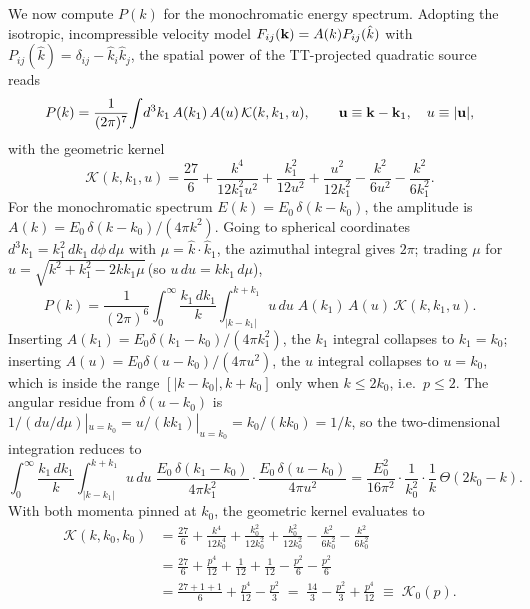 \documentclass[10pt,prd,aps,nobibnotes,superscriptaddress,preprintnumbers,notitlepage]{revtex4-1}
\newcommand{\khat}{\hat{k}}
\newcommand{\kb}{{\bf k}}
\newcommand{\ub}{{\bf u}}
\begin{document}
We now compute $P(k)$ for the monochromatic energy spectrum. Adopting the
isotropic, incompressible velocity model
$F_{ij}(\kb)=A(k)P_{ij}(\khat)$ with $P_{ij}(\khat)=\delta_{ij}-\khat_i\khat_j$,
the spatial power of the TT-projected quadratic source reads
\begin{equation}
  P(k) = \frac{1}{(2\pi)^7}\!\int\!d^3k_1\,
  A(k_1)\,A(u)\,\mathcal{K}(k,k_1,u),
  \qquad \ub\equiv\kb-\kb_1,\quad u\equiv|\ub|,
  \label{eq:Pk-impulsive}
\end{equation}
with the geometric kernel
\begin{equation}
  \mathcal{K}(k,k_1,u) = \frac{27}{6}
  +\frac{k^4}{12k_1^2u^2}+\frac{k_1^2}{12u^2}+\frac{u^2}{12k_1^2}
  -\frac{k^2}{6u^2}-\frac{k^2}{6k_1^2}.
  \label{eq:K-impulsive}
\end{equation}
For the monochromatic spectrum $E(k)=E_0\,\delta(k-k_0)$, the amplitude is
$A(k)=E_0\,\delta(k-k_0)/(4\pi k^2)$. Going to spherical coordinates
$d^3k_1=k_1^2\,dk_1\,d\phi\,d\mu$ with $\mu=\khat\cdot\khat_1$, the azimuthal
integral gives $2\pi$; trading $\mu$ for
$u=\sqrt{k^2+k_1^2-2kk_1\mu}$\,(so $u\,du=kk_1\,d\mu$),
\begin{equation}
  P(k) = \frac{1}{(2\pi)^6}\!\int_0^\infty\!\frac{k_1\,dk_1}{k}
  \!\int_{|k-k_1|}^{k+k_1}\!u\,du\;
  A(k_1)\,A(u)\,\mathcal{K}(k,k_1,u).
  \label{eq:Pk-spherical}
\end{equation}
Inserting $A(k_1)=E_0\delta(k_1-k_0)/(4\pi k_1^2)$, the $k_1$ integral
collapses to $k_1=k_0$; inserting $A(u)=E_0\delta(u-k_0)/(4\pi u^2)$, the $u$
integral collapses to $u=k_0$, which is inside the range $[|k-k_0|,k+k_0]$
only when $k\leq 2k_0$, i.e.\ $p\leq 2$. The angular residue from
$\delta(u-k_0)$ is $1/(du/d\mu)|_{u=k_0}=u/(kk_1)|_{u=k_0}=k_0/(kk_0)=1/k$,
so the two-dimensional integration reduces to
\begin{equation}
  \int_0^\infty\!\frac{k_1\,dk_1}{k}\!
  \int_{|k-k_1|}^{k+k_1}\!u\,du\;
  \frac{E_0\,\delta(k_1-k_0)}{4\pi k_1^2}\cdot
  \frac{E_0\,\delta(u-k_0)}{4\pi u^2}
  = \frac{E_0^2}{16\pi^2}\cdot\frac{1}{k_0^2}\cdot\frac{1}{k}\,\Theta(2k_0-k).
  \label{eq:angular-collapse}
\end{equation}
With both momenta pinned at $k_0$, the geometric kernel evaluates to
\begin{align}
  \mathcal{K}(k,k_0,k_0)
  &= \frac{27}{6}
    +\frac{k^4}{12k_0^4}+\frac{k_0^2}{12k_0^2}+\frac{k_0^2}{12k_0^2}
    -\frac{k^2}{6k_0^2}-\frac{k^2}{6k_0^2}
    \nonumber\\
  &= \frac{27}{6}+\frac{p^4}{12}+\frac{1}{12}+\frac{1}{12}
    -\frac{p^2}{6}-\frac{p^2}{6}
    \nonumber\\
  &= \frac{27+1+1}{6}+\frac{p^4}{12}-\frac{p^2}{3}
  \;=\; \frac{14}{3}-\frac{p^2}{3}+\frac{p^4}{12}
  \;\equiv\; \mathcal{K}_0(p).
  \label{eq:K0-impulsive}
\end{align}
\end{document}
